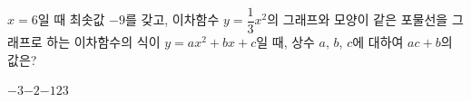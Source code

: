 $x=6$일 때 최솟값 $-9$를 갖고, 이차함수 $y=\dfrac{1}{3}x^2$의 그래프와 모양이 같은 포물선을 그래프로 하는 이차함수의 식이 $y=ax^2+bx+c$일 때, 상수 $a$, $b$, $c$에 대하여 $ac+b$의 값은?
\begin{choices32}{$-3$}{$-2$}{$-1$}{$2$}{$3$}\end{choices32}
